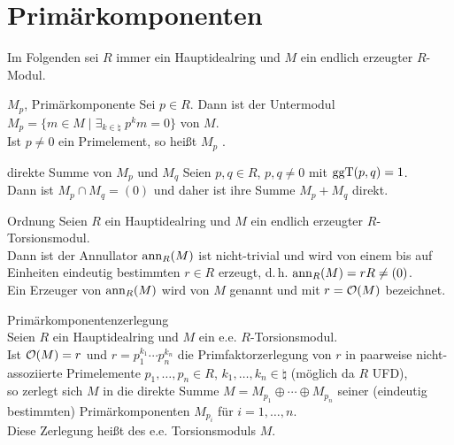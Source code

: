 \section{%
    Primärkomponenten%
}

\begin{Bem}
    Im Folgenden sei $R$ immer ein Hauptidealring und $M$ ein endlich erzeugter
    $R$-Modul.
\end{Bem}

\begin{Def}{$M_p$, Primärkomponente}
    Sei $p \in R$.
    Dann ist  der Untermodul \\
    $M_p = \{m \in M \;|\; \exists_{k \in \natural}\; p^k m = 0\}$ von $M$. \\
    Ist $p \not= 0$ ein Primelement, so heißt $M_p$ .
\end{Def}

\begin{Lemma}{direkte Summe von $M_p$ und $M_q$}
    Seien $p, q \in R$, $p, q \not= 0$ mit $\operatorname{ggT}(p, q) = 1$. \\
    Dann ist $M_p \cap M_q = (0)$ und daher ist ihre Summe $M_p + M_q$ direkt.
\end{Lemma}

\begin{Def}{Ordnung}
    Seien $R$ ein Hauptidealring und $M$ ein endlich erzeugter
    $R$-Torsionsmodul. \\
    Dann ist der Annullator $\operatorname{ann}_R(M)$ ist nicht-trivial und wird von einem
    bis auf Einheiten eindeutig bestimmten $r \in R$ erzeugt, d.\,h.
    $\operatorname{ann}_R(M) = rR \not= (0)$. \\
    Ein Erzeuger von $\operatorname{ann}_R(M)$ wird  von $M$
    genannt und mit $r = \mathcal{O}(M)$ bezeichnet.
\end{Def}

\begin{Satz}{Primärkomponentenzerlegung} \\
    Seien $R$ ein Hauptidealring und $M$ ein e.e.
    $R$-Torsionsmodul. \\
    Ist $\mathcal{O}(M) = r$ und $r = p_1^{k_1} \dotsm p_n^{k_n}$ die
    Primfaktorzerlegung von $r$ in paarweise nicht-assoziierte
    Primelemente $p_1, \dotsc, p_n \in R$, $k_1, \dotsc, k_n \in \natural$
    (möglich da $R$ UFD), \\
    so zerlegt sich $M$ in die direkte Summe
    $M = M_{p_1} \oplus \dotsb \oplus M_{p_n}$
    seiner (eindeutig bestimmten) Primärkomponenten $M_{p_i}$ für
    $i = 1, \dotsc, n$. \\
    Diese Zerlegung heißt  des
    e.e. Torsionsmoduls $M$.
\end{Satz}

